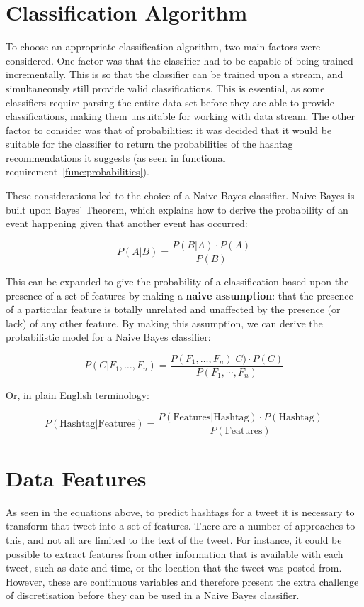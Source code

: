 \documentclass[11pt,a4paper]{report}
\begin{document}
\section{Classification Algorithm}
To choose an appropriate classification algorithm, two main factors were considered. One factor was that the classifier had to be capable of being trained incrementally. This is so that the classifier can be trained upon a stream, and simultaneously still provide valid classifications. This is essential, as some classifiers require parsing the entire data set before they are able to provide classifications, making them unsuitable for working with data stream. The other factor to consider was that of probabilities: it was decided that it would be suitable for the classifier to return the probabilities of the hashtag recommendations it suggests (as seen in functional requirement~\ref{func:probabilities}).

These considerations led to the choice of a Naive Bayes classifier. Naive Bayes is built upon Bayes' Theorem, which explains how to derive the probability of an event happening given that another event has occurred:

\begin{equation}
    P(A|B) = \frac{P(B|A) \cdot P(A)}{P(B)}
\end{equation}

This can be expanded to give the probability of a classification based upon the presence of a set of features by making a \textbf{naive assumption}: that the presence of a particular feature is totally unrelated and unaffected by the presence (or lack) of any other feature. By making this assumption, we can derive the probabilistic model for a Naive Bayes classifier:

\begin{equation}
    P(C|F_1,\dots,F_n) = \frac{P(F_1,\dots,F_n)|C) \cdot P(C)}{P(F_1,\cdots,F_n)}
\end{equation}

Or, in plain English terminology:

\begin{equation}
    P(\text{Hashtag}|\text{Features}) = \frac{P(\text{Features}|\text{Hashtag}) \cdot P(\text{Hashtag})}{P(\text{Features})}
\end{equation}

\section{Data Features}
As seen in the equations above, to predict hashtags for a tweet it is necessary to transform that tweet into a set of features. There are a number of approaches to this, and not all are limited to the text of the tweet. For instance, it could be possible to extract features from other information that is available with each tweet, such as date and time, or the location that the tweet was posted from. However, these are continuous variables and therefore present the extra challenge of discretisation before they can be used in a Naive Bayes classifier.
\end{document}
